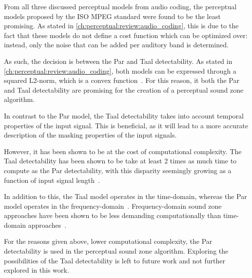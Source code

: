 From all three discussed perceptual models from audio coding, the perceptual models proposed by the ISO MPEG standard were found to be the least promising.
As stated in \autoref{ch:perceptual:review:audio_coding}, this is due to the fact that these models do not define a cost function which can be optimized over:
instead, only the noise that can be added per auditory band is determined.

As such, the decision is between the Par and Taal detectability.
As stated in \autoref{ch:perceptual:review:audio_coding}, both models can be expressed through a squared L2-norm, which is a convex function~\cite{boyd2004convex}.
For this reason, it both the Par and Taal detectability are promising for the creation of a perceptual sound zone algorithm.

In contrast to the Par model, the Taal detectability takes into account temporal properties of the input signal.
This is beneficial, as it will lead to a more accurate description of the masking properties of the input signals.

However, it has been shown to be at the cost of computational complexity.
The Taal detectability has been shown to be take at least 2 times as much time to compute as the Par detectability, with this 
disparity seemingly growing as a function of input signal length~\cite{taal2012low}.

In addition to this, the Taal model operates in the time-domain, whereas the Par model operates in the frequency-domain~\cite{van2005perceptual, taal2012low}.
Frequency-domain sound zone approaches have been shown to be less demanding computationally than time-domain approaches~\cite{vindrola2019personal}.

For the reasons given above, lower computational complexity, the Par detectability is used in the perceptual sound zone algorithm.
Exploring the possibilities of the Taal detectability is left to future work and not further explored in this work.

